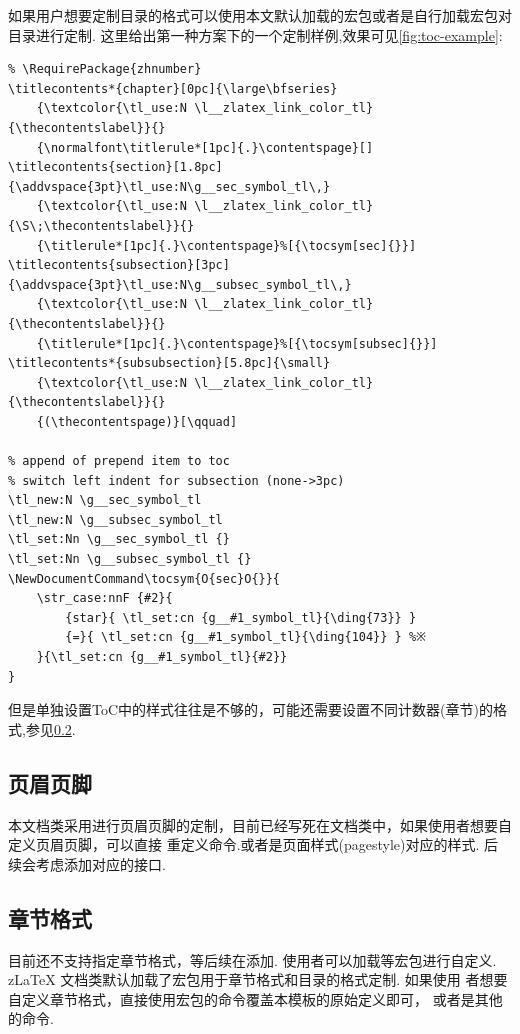 如果用户想要定制目录的格式可以使用本文默认加载的宏包或者是自行加载宏包对目录进行定制.
这里给出第一种方案下的一个定制样例,效果可见\cref{fig:toc-example}:
\begin{verbatim}
% \RequirePackage{zhnumber}
\titlecontents*{chapter}[0pc]{\large\bfseries}
    {\textcolor{\tl_use:N \l__zlatex_link_color_tl}{\thecontentslabel}}{}
    {\normalfont\titlerule*[1pc]{.}\contentspage}[]
\titlecontents{section}[1.8pc]{\addvspace{3pt}\tl_use:N\g__sec_symbol_tl\,}
    {\textcolor{\tl_use:N \l__zlatex_link_color_tl}{\S\;\thecontentslabel}}{}
    {\titlerule*[1pc]{.}\contentspage}%[{\tocsym[sec]{}}]
\titlecontents{subsection}[3pc]{\addvspace{3pt}\tl_use:N\g__subsec_symbol_tl\,}
    {\textcolor{\tl_use:N \l__zlatex_link_color_tl}{\thecontentslabel}}{}
    {\titlerule*[1pc]{.}\contentspage}%[{\tocsym[subsec]{}}]
\titlecontents*{subsubsection}[5.8pc]{\small}
    {\textcolor{\tl_use:N \l__zlatex_link_color_tl}{\thecontentslabel}}{}
    {(\thecontentspage)}[\qquad]

% append of prepend item to toc
% switch left indent for subsection (none->3pc)
\tl_new:N \g__sec_symbol_tl
\tl_new:N \g__subsec_symbol_tl
\tl_set:Nn \g__sec_symbol_tl {}
\tl_set:Nn \g__subsec_symbol_tl {}
\NewDocumentCommand\tocsym{O{sec}O{}}{
    \str_case:nnF {#2}{
        {star}{ \tl_set:cn {g__#1_symbol_tl}{\ding{73}} }
        {=}{ \tl_set:cn {g__#1_symbol_tl}{\ding{104}} } %※
    }{\tl_set:cn {g__#1_symbol_tl}{#2}}
} 
\end{verbatim}

但是单独设置ToC中的样式往往是不够的，可能还需要设置不同计数器(章节)的格式,参见\cref{conter-settings}.

\subsection{页眉页脚}
本文档类采用进行页眉页脚的定制，目前已经写死在文档类中，如果使用者想要自定义页眉页脚，可以直接
重定义\cmd{\fancyhead, \fancyfoot}命令.或者是页面样式(pagestyle)对应的样式. 后续会考虑添加对应的接口.

\subsection{章节格式}\label{conter-settings}
目前还不支持指定章节格式，等后续在添加. 使用者可以加载等宏包进行自定义. z\LaTeX{}
文档类默认加载了宏包用于章节格式和目录的格式定制. 如果使用
者想要自定义章节格式，直接使用宏包的\cmd{\titleformat}命令覆盖本模板的原始定义即可，
或者是其他的命令. 

